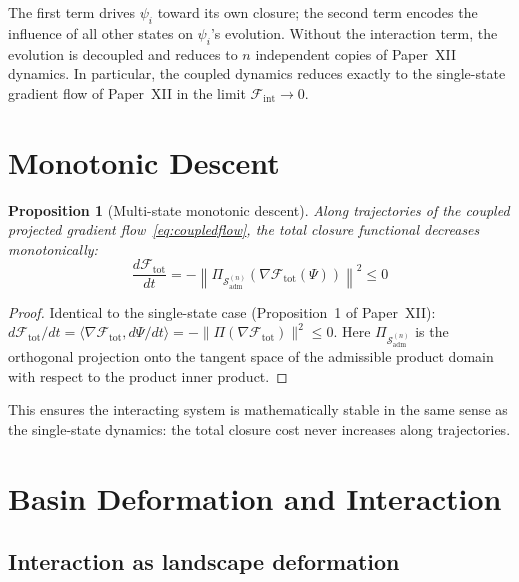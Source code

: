\documentclass[12pt]{article}
\newtheorem{proposition}[theorem]{Proposition}
\newcommand{\Fcal}{\mathcal{F}}
\newcommand{\Sadm}{\mathcal{S}_{\mathrm{adm}}}
\newcommand{\Fint}{\Fcal_{\mathrm{int}}}
\newcommand{\Ftot}{\Fcal_{\mathrm{tot}}}
\begin{document}
The first term drives $\psi_i$ toward its own closure; the second term encodes the influence of all other states on $\psi_i$'s evolution. Without the interaction term, the evolution is decoupled and reduces to $n$ independent copies of Paper~XII dynamics. In particular, the coupled dynamics reduces exactly to the single-state gradient flow of Paper~XII in the limit $\Fint \to 0$.

\section{Monotonic Descent}\label{sec:descent}

\begin{proposition}[Multi-state monotonic descent]\label{prop:descent}
Along trajectories of the coupled projected gradient flow~\eqref{eq:coupledflow}, the total closure functional decreases monotonically:
\begin{equation}
    \frac{d\Ftot}{dt} = -\left\|\Pi_{\Sadm^{(n)}}\!\left(\nabla\Ftot(\Psi)\right)\right\|^2 \leq 0
\end{equation}
\end{proposition}

\begin{proof}
Identical to the single-state case (Proposition~1 of Paper~XII): $d\Ftot/dt = \langle\nabla\Ftot, d\Psi/dt\rangle = -\|\Pi(\nabla\Ftot)\|^2 \leq 0$. Here $\Pi_{\Sadm^{(n)}}$ is the orthogonal projection onto the tangent space of the admissible product domain with respect to the product inner product.
\end{proof}

This ensures the interacting system is mathematically stable in the same sense as the single-state dynamics: the total closure cost never increases along trajectories.

\section{Basin Deformation and Interaction}\label{sec:basins}

\subsection{Interaction as landscape deformation}
\end{document}
